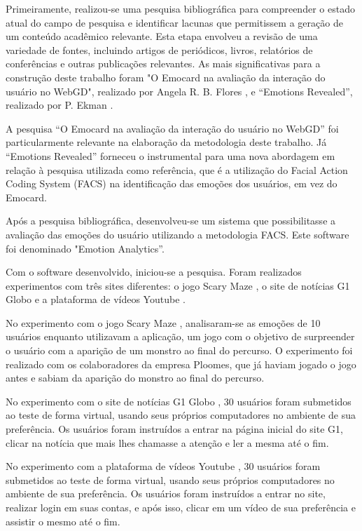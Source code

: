 Primeiramente, realizou-se uma pesquisa bibliográfica para compreender o estado atual do campo de pesquisa e identificar lacunas que permitissem a geração de um conteúdo acadêmico relevante. Esta etapa envolveu a revisão de uma variedade de fontes, incluindo artigos de periódicos, livros, relatórios de conferências e outras publicações relevantes. As mais significativas para a construção deste trabalho foram "O Emocard na avaliação da interação do usuário no WebGD", realizado por Angela R. B. Flores \cite{3}, e “Emotions Revealed”, realizado por P. Ekman \cite{5}.

A pesquisa “O Emocard na avaliação da interação do usuário no WebGD” \cite{5} foi particularmente relevante na elaboração da metodologia deste trabalho. Já “Emotions Revealed” \cite{3} forneceu o instrumental para uma nova abordagem em relação à pesquisa utilizada como referência, que é a utilização do Facial Action Coding System (FACS) \cite{5} na identificação das emoções dos usuários, em vez do Emocard.

Após a pesquisa bibliográfica, desenvolveu-se um sistema que possibilitasse a avaliação das emoções do usuário utilizando a metodologia FACS. Este software foi denominado "Emotion Analytics”.

Com o software desenvolvido, iniciou-se a pesquisa. Foram realizados experimentos com três sites diferentes: o jogo Scary Maze \cite{18}, o site de notícias G1 Globo \cite{19} e a plataforma de vídeos Youtube \cite{20}.

No experimento com o jogo Scary Maze \cite{18}, analisaram-se as emoções de 10 usuários enquanto utilizavam a aplicação, um jogo com o objetivo de surpreender o usuário com a aparição de um monstro ao final do percurso. O experimento foi realizado com os colaboradores da empresa Ploomes, que já haviam jogado o jogo antes e sabiam da aparição do monstro ao final do percurso.

No experimento com o site de notícias G1 Globo \cite{19}, 30 usuários foram submetidos ao teste de forma virtual, usando seus próprios computadores no ambiente de sua preferência. Os usuários foram instruídos a entrar na página inicial do site G1, clicar na notícia que mais lhes chamasse a atenção e ler a mesma até o fim.

No experimento com a plataforma de vídeos Youtube \cite{20}, 30 usuários foram submetidos ao teste de forma virtual, usando seus próprios computadores no ambiente de sua preferência. Os usuários foram instruídos a entrar no site, realizar login em suas contas, e após isso, clicar em um vídeo de sua preferência e assistir o mesmo até o fim.

